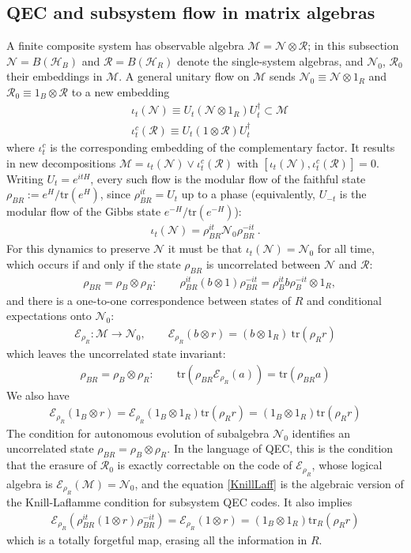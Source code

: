 \documentclass[a4paper,11pt]{article}
\theoremstyle{definition}
\newcommand{\mR}{\mathcal{R}}
\newcommand{\nn}{\nonumber}
\newcommand{\mN}{\mathcal{N}}
\newcommand{\mM}{\mathcal{M}}
\newcommand{\tr}{\text{tr}}
\newcommand{\mE}{\mathcal{E}}
\begin{document}
\subsection{QEC and subsystem flow in matrix algebras}
A finite composite system has observable algebra $\mM=\mN\otimes\mR$; in this subsection $\mN=B(\mathcal H_B)$ and $\mR=B(\mathcal H_R)$ denote the single-system algebras, and $\mN_0$, $\mR_0$ their embeddings in $\mM$. A general unitary flow on $\mM$ sends $\mN_0\equiv \mN\otimes 1_R$ and $\mR_0\equiv 1_B\otimes \mR$ to a new embedding
\begin{align}
&\iota_t(\mN)\equiv U_t(\mN\otimes 1_R)U_t^\dagger\subset\mM  \nn\\
&\iota_t^c(\mR)\equiv U_t(1\otimes \mR)U_t^\dagger
\end{align}
where $\iota_t^c$ is the corresponding embedding of the complementary factor. It results in new decompositions $\mM=\iota_t(\mN)\vee\iota_t^c(\mR)$ with $[\iota_t(\mN),\iota_t^c(\mR)]=0$.
Writing $U_t=e^{itH}$, every such flow is the modular flow of the faithful state $\rho_{BR}:=e^{H}/\tr(e^{H})$, since $\rho_{BR}^{it}=U_t$ up to a phase (equivalently, $U_{-t}$ is the modular flow of the Gibbs state $e^{-H}/\tr(e^{-H})$):
\begin{align}
    \iota_t(\mN)=\rho_{BR}^{it}\mN_0\rho_{BR}^{-it}\ .
\end{align}
For this dynamics to preserve $\mN$ it must be that $\iota_t(\mN)=\mN_0$ for all time, which occurs if and only if the state $\rho_{BR}$ is uncorrelated between $\mN$ and $\mR$:
\begin{align}
 &   \rho_{BR}=\rho_B\otimes \rho_R:\qquad     \rho_{BR}^{it}(b\otimes 1)\rho_{BR}^{-it}=\rho_B^{it}b\rho_B^{-it}\otimes 1_R,
\end{align}
and there is a one-to-one correspondence between states of $R$ and conditional expectations onto $\mN_0$:
\begin{align}
    \mE_{\rho_R}:\mM\to \mN_0, \qquad \mE_{\rho_R}(b\otimes r)=(b\otimes 1_R)\: \tr(\rho_R r)
\end{align}
which leaves the uncorrelated state invariant:
\begin{align}
    \rho_{BR}=\rho_B\otimes \rho_R:\qquad \tr(\rho_{BR}\mE_{\rho_R}(a))=\tr(\rho_{BR} a)
\end{align}
We also have
\begin{align}\label{KnillLaff}
    \mE_{\rho_R}(1_B\otimes r)=\mE_{\rho_R}(1_B\otimes 1_R)\tr(\rho_R r)=(1_B\otimes 1_R)\tr(\rho_R r)
\end{align}
The condition for autonomous evolution of subalgebra $\mN_0$ identifies an uncorrelated state $\rho_{BR}=\rho_B\otimes \rho_R$. In the language of QEC, this is the condition that the erasure of $\mR_0$ is exactly correctable on the code of $\mE_{\rho_R}$, whose logical algebra is $\mE_{\rho_R}(\mM)=\mN_0$, and the equation \eqref{KnillLaff} is the algebraic version of the Knill-Laflamme condition for subsystem QEC codes. It also implies
\begin{align}
    \mE_{\rho_R}(\rho_{BR}^{it}(1\otimes r)\rho_{BR}^{-it})=\mE_{\rho_R}(1\otimes r)=(1_B\otimes 1_R)\tr_R(\rho_R r)
\end{align}
which is a totally forgetful map, erasing all the information in $R$.
\end{document}
